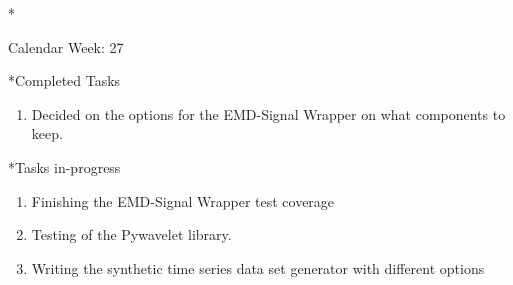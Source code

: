 \documentclass[11pt,a4paper]{article}
\begin{document}
\newpage
\begin{section}*{Calendar Week: 27 \hfill \date{09 July, 2021}}
	
	\begin{subsection}*{Completed Tasks}
		\begin{enumerate}
			\item Decided on the options for the EMD-Signal Wrapper on what components to keep.
		\end{enumerate}
	\end{subsection}
	
	\begin{subsection}*{Tasks in-progress}
		\begin{enumerate}
			\item Finishing the EMD-Signal Wrapper test coverage
			\item Testing of the Pywavelet library.
			\item Writing the synthetic time series data set generator with different options
		\end{enumerate}
	\end{subsection}
	
\end{section}
\end{document}
